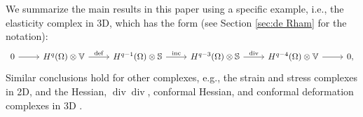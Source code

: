 \documentclass[11pt]{amsart}
\newcommand{\0}{\mathaccent23}
\newcommand\inc{\operatorname{inc}}
\newcommand\deff{\operatorname{def}}
\renewcommand\div{\operatorname{div}}
\begin{document}
 
We summarize the main results in this paper using a specific example, i.e., the elasticity complex in 3D, which has the form (see Section \ref{sec:de Rham} for the notation):
\begin{equation}\label{elasticity-q}
\begin{tikzcd}
0\arrow{r}& H^{q}(\Omega)\otimes \mathbb{V}\arrow{r}{\deff} &  H^{q-1}(\Omega)\otimes \mathbb{S} \arrow{r}{\inc} &  H^{q-3}(\Omega)\otimes \mathbb{S} \arrow{r}{\div} &H^{q-4}(\Omega)\otimes \mathbb{V}\arrow{r} & 0,
\end{tikzcd}
\end{equation}
Similar conclusions hold for other complexes, e.g., the strain and stress complexes in 2D, and the Hessian, $\div\div$, conformal Hessian, and conformal deformation complexes in 3D \cite{arnold2021complexes,vcap2022bgg}.
\end{document}
